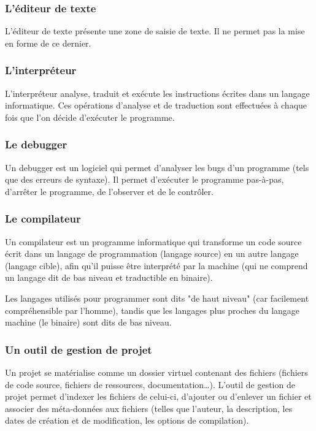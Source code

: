 \documentclass[a4paper,12pt]{article}
\begin{document}
		\subsubsection*{L'éditeur de texte}

			L'éditeur de texte présente une zone  de saisie de texte. Il ne permet
			pas la mise en forme de ce dernier.

		\subsubsection*{L'interpréteur}

			L'interpréteur analyse,  traduit et  exécute les  instructions écrites
			dans  un   langage  informatique.  Ces  opérations   d'analyse  et  de
			traduction sont effectuées à chaque fois que l'on décide d'exécuter le
			programme.

		\subsubsection*{Le debugger}

			Un  debugger est  un  logiciel  qui permet  d'analyser  les bugs  d'un
			programme (tels que  des erreurs de syntaxe). Il  permet d'exécuter le
			programme pas-à-pas,  d'arrêter le programme,  de l'observer et  de le
			contrôler.

		\subsubsection*{Le compilateur}

			Un compilateur est un programme informatique qui transforme un code source écrit dans un langage de programmation 					(langage source) en un autre langage (langage cible), afin qu'il puisse être interprété par la machine (qui ne 						comprend un langage dit de bas niveau et traductible en binaire).

			Les langages utilisés pour programmer sont dits "de haut niveau" (car facilement compréhensible par l'homme), tandis 				que les langages plus proches du langage machine (le binaire) sont dits de bas niveau. 

		\subsubsection*{Un outil de gestion de projet}

			Un  projet  se matérialise  comme  un  dossier virtuel  contenant  des
			fichiers   (fichiers  de   code   source,   fichiers  de   ressources,
			documentation\dots).  L'outil  de gestion  de projet  permet d'indexer
			les  fichiers  de  celui-ci,  d'ajouter ou  d'enlever  un  fichier  et
			associer  des  méta-données  aux  fichiers (telles  que  l'auteur,  la
			description, les dates de création  et de modification, les options de
			compilation).
			
\end{document}
